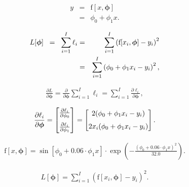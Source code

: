 \documentclass[letterpaper,twoside,openany, titlepage,oldfontcommands,titles,dvipsnames]{memoir}
\begin{document}
\begin{eqnarray}
  y &=& \mbox{f}[x,\boldsymbol\phi]\nonumber \\
  &=& \phi_{0} + \phi_{1}x.
 \end{eqnarray}

\begin{eqnarray}\label{eq:train_lr_cost_function}
  L[\boldsymbol\phi] \hspace{0.2cm}= \hspace{0.2cm}\sum_{i=1}^{I} \ell_{i} &=& \sum_{i=1}^{I} \left(\mbox{f}[x_i,\boldsymbol\phi]-y_{i}\right)^{2}\nonumber \\
  &=& \sum_{i=1}^{I} \left(\phi_{0}+\phi_{1}x_{i}-y_{i}\right)^{2},
 \end{eqnarray}

\begin{eqnarray}\label{eq:train_linear_deriv1}
  \frac{\partial L}{\partial \boldsymbol\phi} = \frac{\partial}{\partial \boldsymbol\phi}\sum_{i=1}^{I} \ell_{i} = \sum_{i=1}^{I} \frac{\partial \ell_{i}}{\partial \boldsymbol\phi},
 \end{eqnarray}

\begin{eqnarray}\label{eq:train_linear_deriv2}
  \frac{\partial \ell_{i}}{\partial \boldsymbol\phi} = \begin{bmatrix}\frac{\partial \ell_{i}}{\partial \phi_{0}}\\\vspace{-0.2cm}\\\frac{\partial \ell_{i}}{\partial \phi_{1}}\end{bmatrix} = \begin{bmatrix}2(\phi_{0}+\phi_{1}x_{i}-y_{i})\\ \vspace{-0.2cm}\\ 2x_{i}(\phi_{0}+\phi_{1}x_{i}-y_{i})\end{bmatrix}.
 \end{eqnarray}

\begin{eqnarray}\label{eq:train_gabor}
 \mbox{f}[x,\boldsymbol\phi] = \sin[\phi_0 + 0.06\cdot\phi_{1}x]\cdot \exp\left(-\frac{(\phi_0+0.06\cdot\phi_{1}x)^2}{32.0}\right).
 \end{eqnarray}

\begin{eqnarray}
  L[\boldsymbol\phi] = \sum_{i=1}^{I}\left(\mbox{f}[x_{i},\boldsymbol\phi]-y_{i}\right)^2.
 \end{eqnarray}
\end{document}
